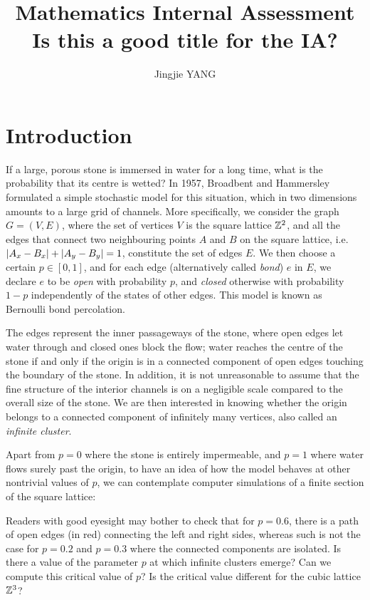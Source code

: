 \documentclass[a4paper, 12pt]{article}
\title{
\textbf{Mathematics Internal Assessment}\\
\bigskip
Is this a good title for the IA?
}
\author{Jingjie YANG}
\date{}
\begin{document}
\maketitle

\section{Introduction}\label{ch:intro}
If a large, porous stone is immersed in water for a long time, what is the probability that its centre is wetted? In 1957, Broadbent and Hammersley \autocite*[693]{broadbent_hammersley_1957} formulated a simple stochastic model for this situation, which in two dimensions amounts to a large grid of channels. More specifically, we consider the graph $G = (V, E)$, where the set of vertices $V$ is the square lattice $\mathbb{Z}^2$, and all the edges that connect two neighbouring points $A$ and $B$ on the square lattice, i.e.\ $\lvert A_x - B_x \rvert + \lvert A_y - B_y \rvert = 1$, constitute the set of edges $E$. We then choose a certain $p \in [0, 1]$, and for each edge (alternatively called \textit{bond}) $e$ in $E$, we declare $e$ to be \textit{open} with probability $p$, and \textit{closed} otherwise with probability $1 - p$ independently of the states of other edges. This model is known as Bernoulli bond percolation.



The edges represent the inner passageways of the stone, where open edges let water through and closed ones block the flow; water reaches the centre of the stone if and only if the origin is in a connected component of open edges touching the boundary of the stone. In addition, it is not unreasonable to assume that the fine structure of the interior channels is on a negligible scale compared to the overall size of the stone. We are then interested in knowing whether the origin belongs to a connected component of infinitely many vertices, also called an \textit{infinite cluster}. 

Apart from $p = 0$ where the stone is entirely impermeable, and $p = 1$ where water flows surely past the origin, to have an idea of how the model behaves at other nontrivial values of $p$, we can contemplate computer simulations of a finite section of the square lattice:


\break 

Readers with good eyesight may bother to check that for $p = 0.6$, there is a path of open edges (in red) connecting the left and right sides, whereas such is not the case for $p = 0.2$ and $p = 0.3$ where the connected components are isolated. Is there a value of the parameter $p$ at which infinite clusters emerge? Can we compute this critical value of $p$? Is the critical value different for the cubic lattice $\mathbb{Z}^3$?
\end{document}
